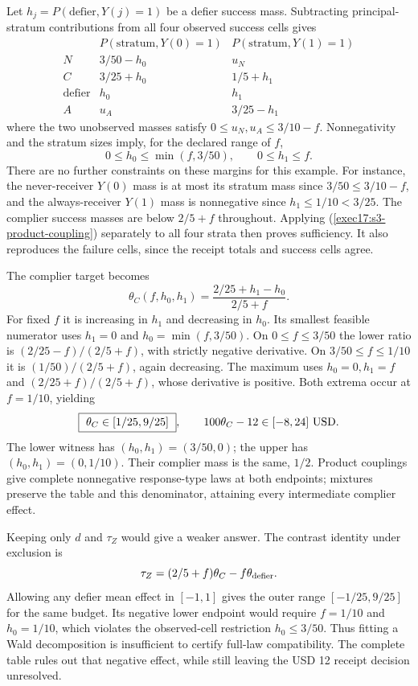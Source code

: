 Let $h_j=P(\text{defier},Y(j)=1)$ be a defier success mass. Subtracting
principal-stratum contributions from all four observed success cells gives
\[
\begin{array}{c|cc}
 &P(\text{stratum},Y(0)=1)&P(\text{stratum},Y(1)=1)\\ \hline
 N&3/50-h_0&u_N\\
 C&3/25+h_0&1/5+h_1\\
 \text{defier}&h_0&h_1\\
 A&u_A&3/25-h_1
\end{array}
\]
where the two unobserved masses satisfy
$0\leq u_N,u_A\leq3/10-f$. Nonnegativity and the stratum sizes imply,
for the declared range of $f$,
\[
 0\leq h_0\leq\min(f,3/50),\qquad 0\leq h_1\leq f .
 \label{exec17:s3-defier-feasible}
\]
There are no further constraints on these margins for this example.
For instance, the never-receiver $Y(0)$ mass is at most its stratum
mass since $3/50\leq3/10-f$, and the always-receiver $Y(1)$ mass
is nonnegative since $h_1\leq1/10<3/25$.
The complier success masses are below $2/5+f$ throughout.
Applying (\ref{exec17:s3-product-coupling}) separately to all four
strata then proves sufficiency. It also reproduces the failure cells,
since the receipt totals and success cells agree.

The complier target becomes
\[
 \theta_C(f,h_0,h_1)
 =\frac{2/25+h_1-h_0}{2/5+f}.
 \label{exec17:s3-defier-ratio}
\]
For fixed $f$ it is increasing in $h_1$ and decreasing in $h_0$.
Its smallest feasible numerator uses $h_1=0$ and
$h_0=\min(f,3/50)$. On $0\leq f\leq3/50$ the lower ratio is
$(2/25-f)/(2/5+f)$, with strictly negative derivative.
On $3/50\leq f\leq1/10$ it is
$(1/50)/(2/5+f)$, again decreasing.
The maximum uses $h_0=0,h_1=f$ and
$(2/25+f)/(2/5+f)$, whose derivative is positive.
Both extrema occur at $f=1/10$, yielding
\[
 \boxed{\ \theta_C\in[1/25,9/25]\ },\qquad
 100\theta_C-12\in[-8,24]\ {\rm USD}.
 \label{exec17:s3-defier-sharp}
\]
The lower witness has $(h_0,h_1)=(3/50,0)$; the upper has
$(h_0,h_1)=(0,1/10)$. Their complier mass is the same, $1/2$.
Product couplings give complete nonnegative response-type laws at both
endpoints; mixtures preserve the table and this denominator, attaining
every intermediate complier effect.

Keeping only $d$ and $\tau_Z$ would give a weaker answer. The contrast
identity under exclusion is
\[
 \tau_Z=(2/5+f)\theta_C-f\theta_{\rm defier}.
\]
Allowing any defier mean effect in $[-1,1]$ gives the outer range
$[-1/25,9/25]$ for the same budget. Its negative lower endpoint
would require $f=1/10$ and $h_0=1/10$, which violates the
observed-cell restriction $h_0\leq3/50$.
Thus fitting a Wald decomposition is insufficient to certify full-law
compatibility. The complete table rules out that negative effect, while
still leaving the USD 12 receipt decision unresolved.

